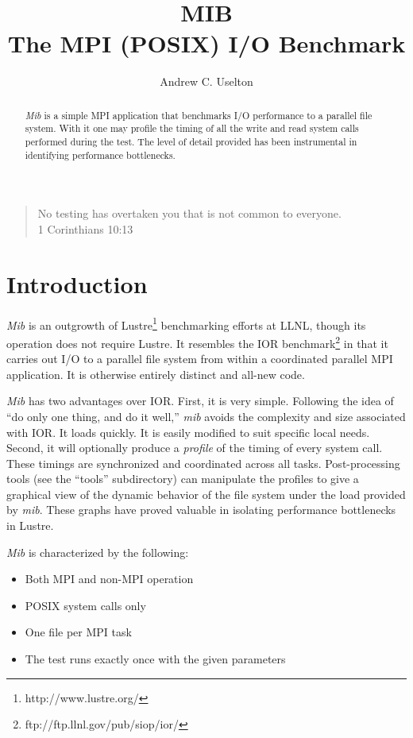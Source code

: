\documentclass{article}
\author{Andrew C. Uselton}
\title{
  MIB \\
  The MPI (POSIX) I/O Benchmark
}
\begin{document}
\maketitle

\begin{quote}
No testing has overtaken you that is not common to everyone. \\
1 Corinthians 10:13
\end{quote}


\begin{abstract} 
{\em Mib} is a simple MPI application that benchmarks I/O performance to a
parallel file system.  With it one may profile the timing of all the
write and read system calls performed during the test.  The level of
detail provided has been instrumental in identifying performance
bottlenecks.
\end{abstract}

\section{Introduction}\label{section.introduction}

{\em Mib} is an outgrowth of Lustre\footnote{http://www.lustre.org/}
benchmarking efforts at LLNL, though its operation does not require
Lustre.  It resembles the IOR
benchmark\footnote{ftp://ftp.llnl.gov/pub/siop/ior/} in that it
carries out I/O to a parallel file system from within a coordinated
parallel MPI application.  It is otherwise entirely distinct and
all-new code.

{\em Mib} has two advantages over IOR.  First, it is very simple.
Following the idea of ``do only one thing, and do it well,'' {\em mib}
avoids the complexity and size associated with IOR.  It loads quickly.
It is easily modified to suit specific local needs.  Second, it will
optionally produce a {\em profile} of the timing of every system call.
These timings are synchronized and coordinated across all tasks.
Post-processing tools (see the ``tools'' subdirectory) can manipulate
the profiles to give a graphical view of the dynamic behavior of the
file system under the load provided by {\em mib}.  These graphs have
proved valuable in isolating performance bottlenecks in Lustre.

{\em Mib} is characterized by the following:
\begin{itemize}
\item Both MPI and non-MPI operation
\item POSIX system calls only
\item One file per MPI task
\item The test runs exactly once with the given parameters
\end{itemize}
\end{document}
